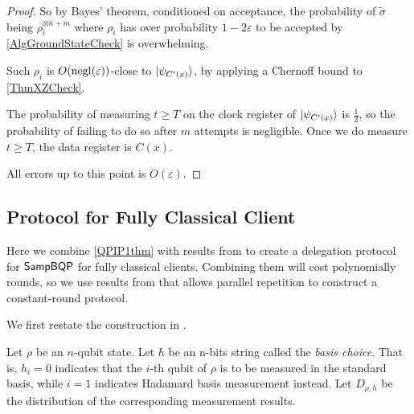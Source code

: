 \begin{proof}
	So by Bayes' theorem, conditioned on acceptance, the probability of $\tilde{\sigma}$ being $\rho_i^{\otimes n+m}$ where $\rho_i$ has over probability $1-2\varepsilon$ to be accepted by \autoref{AlgGroundStateCheck} is overwhelming.

	Such $\rho_i$ is $O(\operatorname{negl}(\varepsilon))$-close to $\ket{\psi_{C'(x)}}$, by applying a Chernoff bound to \autoref{ThmXZCheck}.

	The probability of measuring $t\geq T$ on the clock register of $\ket{\psi_{C'(x)}}$ is $\frac{1}{2}$, so the probability of failing to do so after $m$ attempts is negligible.
	Once we do measure $t\geq T$, the data register is $C(x)$.

	All errors up to this point is $O(\varepsilon)$.
\end{proof}

\subsection{Protocol for Fully Classical Client}

Here we combine \autoref{QPIP1thm} with results from \cite{mahadev_delegation} to create a delegation protocol for $\operatorname{\mathsf{SampBQP}}$ for fully classical clients. Combining them will cost polynomially rounds, so we use results from \cite{parallelrep} that allows parallel repetition to construct a constant-round protocol.

We first restate the construction in \cite{mahadev_delegation}.

Let $\rho$ be an $n$-qubit state. Let $h$ be an n-bits string called the \emph{basis choice}. That is, $h_i=0$ indicates that the $i$-th qubit of $\rho$ is to be measured in the standard basis, while $i=1$ indicates Hadamard basis measurement instead. Let $D_{\rho, h}$ be the distribution of the corresponding measurement results.

